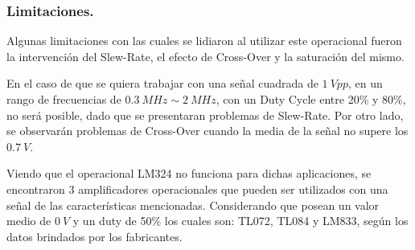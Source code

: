\subsubsection{Limitaciones.}
Algunas limitaciones con las cuales se lidiaron al utilizar este operacional fueron la intervención del Slew-Rate, el efecto de Cross-Over y la saturación del mismo.

En el caso de que se quiera trabajar con una señal cuadrada de $1 \ Vpp$, en un rango de frecuencias de $0.3 \ MHz \sim 2 \ MHz$, con un Duty Cycle entre 20\% y 80\%, no será posible, dado que se presentaran problemas de Slew-Rate. Por otro lado, se observarán problemas de Cross-Over cuando la media de la señal no supere los $0.7 \ V$.

Viendo que el operacional LM324 no funciona para dichas aplicaciones, se encontraron 3 amplificadores operacionales que pueden ser utilizados con una señal de las características mencionadas. Considerando que posean un valor medio de $0 \ V$ y un duty de 50\% los cuales son: TL072, TL084 y LM833, según los datos brindados por los fabricantes.
